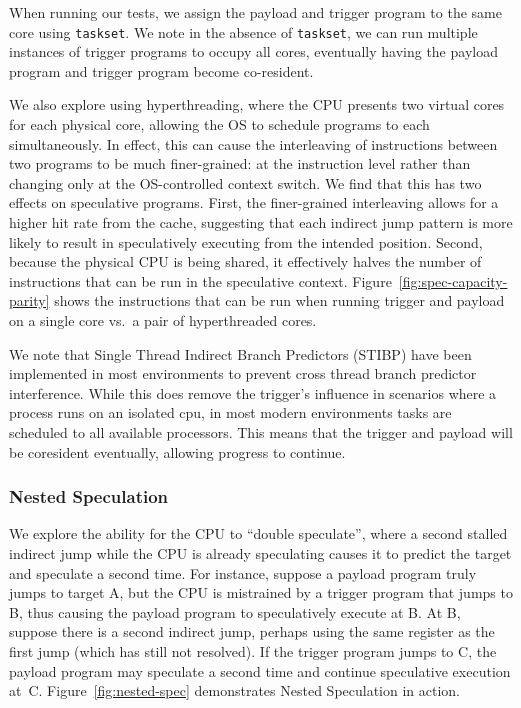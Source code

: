 When running our tests, we assign the payload and trigger program to the same
core using \texttt{taskset}. We note in the absence of \texttt{taskset}, we can
run multiple instances of trigger programs to occupy all cores, eventually
having the payload program and trigger program become co-resident.

We also explore using hyperthreading, where the CPU presents two virtual cores
for each physical core, allowing the OS to schedule programs to each
simultaneously. In effect, this can cause the interleaving of instructions
between two programs to be much finer-grained: at the instruction level rather
than changing only at the OS-controlled context switch. We find that this
has two effects on speculative programs. First, the finer-grained interleaving
allows for a higher hit rate from the cache, suggesting that each indirect jump
pattern is more likely to result in speculatively executing from the intended
position. %
Second, because the physical CPU is being shared, it effectively halves the
number of instructions that can be run in the speculative context.
Figure~\ref{fig:spec-capacity-parity} shows the instructions that can be run when
running trigger and payload on a single core vs.\ a pair of hyperthreaded cores.

We note that Single Thread Indirect Branch Predictors (STIBP) have been implemented
in most environments to prevent cross thread branch predictor interference.
While this does remove the \speculake trigger's influence in scenarios where a
process runs on an isolated cpu, in most modern environments
tasks are scheduled to all available processors. This means that the trigger and
payload will be coresident eventually, allowing progress to continue.


\subsubsection{Nested Speculation}
\label{sssec:nested-spec}

We explore the ability for the CPU to ``double speculate'', where a second
stalled indirect jump while the CPU is already speculating causes it to predict
the target and speculate a second time. For instance, suppose a payload program
truly jumps to target A, but the CPU is mistrained by a trigger program that
jumps to B, thus causing the payload program to speculatively execute at B. At
B, suppose there is a second indirect jump, perhaps using the same register as
the first jump (which has still not resolved). If the trigger program jumps to
C, the payload program may speculate a second time and continue speculative
execution at~C. Figure~\ref{fig:nested-spec} demonstrates Nested Speculation in
action.

